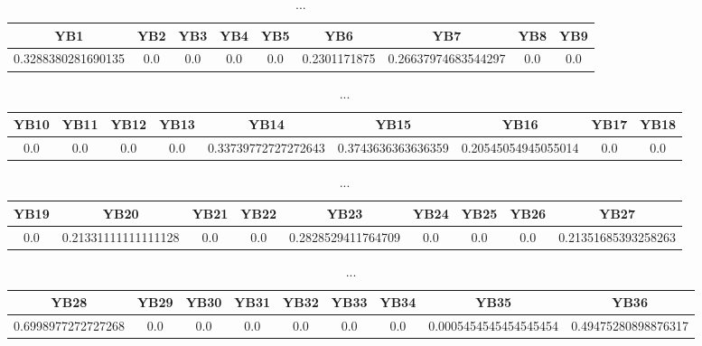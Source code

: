 \documentclass[]{article}
\begin{document}
\begin{table}[h]
      \centering
      \begin{tabular}{|c|c|c|c|c|c|c|c|c|}
            \hline
            YB1                & YB2 & YB3 & YB4 & YB5 & YB6          & YB7                 & YB8 & YB9 \\
            \hline
            0.3288380281690135 & 0.0 & 0.0 & 0.0 & 0.0 & 0.2301171875 & 0.26637974683544297 & 0.0 & 0.0 \\
            \hline
      \end{tabular}
      \caption{...}
\end{table}
\begin{table}[h]
      \centering
      \begin{tabular}{|c|c|c|c|c|c|c|c|c|}
            \hline
            YB10 & YB11 & YB12 & YB13 & YB14                & YB15               & YB16                & YB17 & YB18 \\
            \hline
            0.0  & 0.0  & 0.0  & 0.0  & 0.33739772727272643 & 0.3743636363636359 & 0.20545054945055014 & 0.0  & 0.0  \\
            \hline
      \end{tabular}
      \caption{...}
\end{table}
\begin{table}[h]
      \centering
      \begin{tabular}{|c|c|c|c|c|c|c|c|c|}
            \hline
            YB19 & YB20                & YB21 & YB22 & YB23               & YB24 & YB25 & YB26 & YB27                \\
            \hline
            0.0  & 0.21331111111111128 & 0.0  & 0.0  & 0.2828529411764709 & 0.0  & 0.0  & 0.0  & 0.21351685393258263 \\
            \hline
      \end{tabular}
      \caption{...}
\end{table}
\begin{table}[h]
      \centering
      \begin{tabular}{|c|c|c|c|c|c|c|c|c|}
            \hline
            YB28               & YB29 & YB30 & YB31 & YB32 & YB33 & YB34 & YB35                  & YB36                \\
            \hline
            0.6998977272727268 & 0.0  & 0.0  & 0.0  & 0.0  & 0.0  & 0.0  & 0.0005454545454545454 & 0.49475280898876317 \\
            \hline
      \end{tabular}
      \caption{...}
\end{table}
\end{document}
